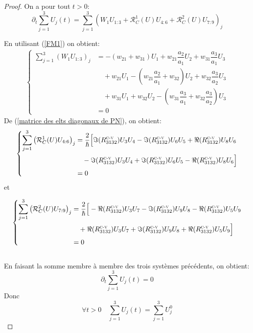 \documentclass[12pt,a4paper,openany,oneside]{book}
\begin{document}
{{{{{{\begin{proof}
On a pour tout $ t> 0$:
$$ 
\partial_{t}\sum_{j=1}^{3}U_{j}(t)=\sum_{j=1}^{3}\left(W_{1}U_{1:3}+\mathcal{R}^{1}_{C}(U)U_{4:6}+\mathcal{R}^{2}_{C}(U)U_{7:9}\right)_{j}
$$

 En utilisant (\ref{FM1}) on obtient:
\begin{eqnarray*}
 \left\{
 \begin{split}
\sum_{j=1}^{3}\left(W_{1}U_{1:3}\right)_{j} & =  -(w_{21} + w_{31})U_{1} + w_{21}\dfrac{a_{2}}{a_{1}}U_{2}+ w_{31}\dfrac{a_{3}}{a_{1}}U_{3} \\
&\quad +  w_{21}U_{1}-(w_{21}\dfrac{a_{2}}{a_{1}} + w_{32})U_{2} + w_{32}\dfrac{a_{3}}{a_{2}}U_{3} \\
&\quad + w_{31}U_{1}+ w_{32}U_{2}-(w_{31}\dfrac{a_{3}}{a_{1}} + w_{32}\dfrac{a_{3}}{a_{2}})U_{3} \\
 & = 0  
  \end{split}  
   \right.   
  \end{eqnarray*}
De (\ref{matrice des elts diagonaux de PN}), on obtient:
\begin{eqnarray*}
  \left\{
\begin{split}
\sum_{j=1}^{3}\left(\mathcal{R}^{1}_{C}(U)U_{4:6}\right)_{j} &= \dfrac{2}{\hbar}\Big[\Im(R^{\textsc{c-v}}_{3132})U_{3}U_{4}-\Im(R^{\textsc{c-v}}_{3132})U_{6}U_{5}+\Re(R^{\textsc{c-v}}_{3132})U_{8}U_{6}\\
&\quad -\Im(R^{\textsc{c-v}}_{3132})U_{3}U_{4}+ \Im(R^{\textsc{c-v}}_{3132})U_{6}U_{5}-\Re(R^{\textsc{c-v}}_{3132})U_{8}U_{6}\Big]\\
&= 0
\end{split}
\right.
 \end{eqnarray*}
 et 

\begin{eqnarray*}
  \left\{
\begin{split}
\sum_{j=1}^{3}\left(\mathcal{R}^{2}_{C}(U)U_{7:9}\right)_{j} &= \dfrac{2}{\hbar}\Big[-\Re(R^{\textsc{c-v}}_{3132})U_{3}U_{7}-\Im(R^{\textsc{c-v}}_{3132})U_{9}U_{8}-\Re(R^{\textsc{c-v}}_{3132})U_{5}U_{9}\\
&\quad +\Re(R^{\textsc{c-v}}_{3132})U_{3}U_{7}+\Im(R^{\textsc{c-v}}_{3132})U_{9}U_{8}+\Re(R^{\textsc{c-v}}_{3132})U_{5}U_{9}\Big]\\
&= 0
\end{split}
\right.
 \end{eqnarray*}\\

 En faisant la somme membre à membre des trois systèmes précédents, on obtient:    
$$ \partial_{t}\sum_{j=1}^{3}U_{j}(t)=0 $$
Donc 
$$ \forall t> 0 \quad \sum_{j=1}^{3}U_{j}(t)= \sum_{j=1}^{3}U_{j}^{0}$$



\end{proof}}}}}}}
\end{document}

